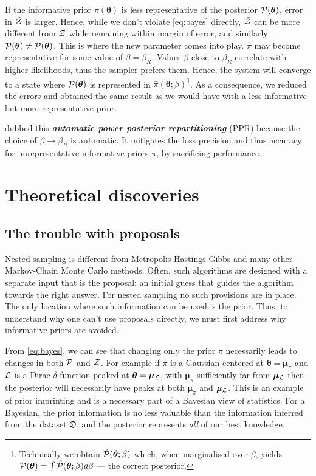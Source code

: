 \documentclass[usenatbib]{mnras}
\begin{document}
If the informative prior \(\pi (\bm{\theta})\) is less representative
of the posterior \( \bar{\cal P} (\bm{\theta})\), error in
$\hat{\cal Z}$ is larger. Hence, while we don't violate
\cref{eq:bayes} directly, $\bar{\cal Z}$ can be more different from
${\cal Z}$ while remaining within margin of error, and similarly
${\cal P}(\bm{\theta}) \ne \bar{\cal P}(\bm{\theta})$. This is where
the new parameter comes into play. $\hat{\pi}$ may become
representative for some value of $\beta = \beta_{R}$. Values $\beta$
close to $\beta_{R}$ correlate with higher likelihoods, thus the
sampler prefers them. Hence, the system will converge to a state where
\( {\cal P} (\bm{\theta})\) is represented in
\(\hat{\pi} (\bm{\theta};\beta)\)\footnote{Technically we obtain
  \( \hat{\cal P} (\bm{\theta};\beta)\) which, when marginalised over
  $\beta$, yields
  \( {\cal P} (\bm{\theta}) = \int \hat{\cal P} (\bm{\theta};\beta) d
  \beta\) --- the correct posterior.}.  As a consequence, we reduced
the errors and obtained the same result as we would have with a less
informative but more representative prior.

\cite{chen-ferroz-hobson} dubbed this \textbf{\emph{automatic power posterior
  repartitioning}} (PPR) because the choice of
$\beta\rightarrow\beta_{R}$ is automatic. It mitigates the loss
precision and thus accuracy for unrepresentative informative priors
$\pi$, by sacrificing performance.

\pagebreak[2]
\section{Theoretical discoveries}
\subsection{The trouble with proposals\label{sec:prejudice}}

Nested sampling is different from Metropolis-Hastings-Gibbs and many
other Markov-Chain Monte Carlo methods. Often, such algorithms are
designed with a separate input that is the proposal: an initial guess
that guides the algorithm towards the right answer.  For nested
sampling no such provisions are in place. The only location where such
information can be used is the prior.  Thus, to understand why one
can't use proposals directly, we must first address why informative
priors are avoided.

From \cref{eq:bayes}, we can see that changing only the prior $\pi$
necessarily leads to changes in both ${\cal P}$ and ${\cal Z}$. For
example if $\pi$ is a Gaussian centered at
$\bm{\theta}=\bm{\mu}_{\pi}$ and ${\cal L}$ is a Dirac
$\delta$-function peaked at $\bm{\theta}=\bm{\mu}_{{\cal L}}$, with
$\bm{\mu}_{\pi}$ sufficiently far from $\bm{\mu}_{{\cal L}}$ then the
posterior will necessarily have peaks at both $\bm{\mu}_{\pi}$ and
$\bm{\mu}_{{\cal L}}$. This is an example of prior imprinting and is a
necessary part of a Bayesian view of statistics. For a Bayesian, the
prior information is no less valuable than the information inferred
from the dataset \(\mathfrak{D}\), and the posterior represents
\emph{all} of our best knowledge.
\end{document}
